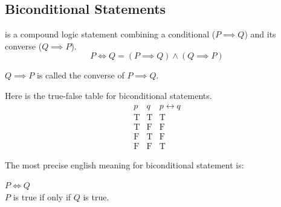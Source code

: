 \subsection{Biconditional Statements}
\begin{definition}
    is a compound logic statement combining a conditional ($P \implies Q$) and its converse ($Q \implies P$).
    $$P \iff Q = (P \implies Q) \wedge (Q \implies P)$$
\end{definition}

$Q \implies P$ is called the converse of $P \implies Q$.

Here is the true-false table for biconditional statements. 
\[
\begin{array}{c|c|c}
p & q & p \leftrightarrow q \\
\hline
\text{T} & \text{T} & \text{T} \\
\text{T} & \text{F} & \text{F} \\
\text{F} & \text{T} & \text{F} \\
\text{F} & \text{F} & \text{T}
\end{array}
\]

The most precise english meaning for biconditional statement is: 
\begin{center}
    $P \iff Q$ \\
    $P$ is true if only if $Q$ is true. 
\end{center}
\newpage